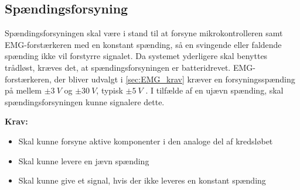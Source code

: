 \subsection{Spændingsforsyning} \label{sec:krav_spaending}
Spændingsforsyningen skal være i stand til at forsyne mikrokontrolleren samt EMG-forstærkeren med en konstant spænding, så en svingende eller faldende spænding ikke vil forstyrre signalet. Da systemet yderligere skal benyttes trådløst, kræves det, at spændingsforsyningen er batteridrevet. EMG-forstærkeren, der bliver udvalgt i \autoref{sec:EMG_krav} kræver en forsyningsspænding på mellem $\pm 3~V$ og $\pm 30~V$, typisk $\pm 5~V$ \citep{advancertech2013}.
I tilfælde af en ujævn spænding, skal spændingsforsyningen kunne signalere dette. 


\vspace{3mm}
\textbf{Krav:}
\begin{itemize} 
\item Skal kunne forsyne aktive komponenter i den analoge del af kredsløbet
\item Skal kunne levere en jævn spænding
\item Skal kunne give et signal, hvis der ikke leveres en konstant spænding 
\end{itemize}
